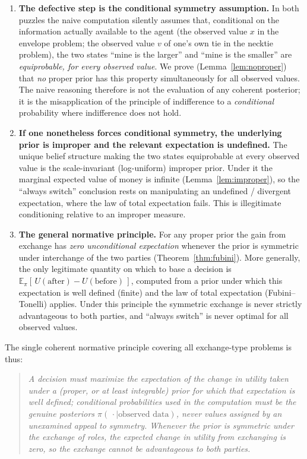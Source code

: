\documentclass{amsart}
\theoremstyle{plain}
\theoremstyle{definition}
\begin{document}
\begin{enumerate}
\item[(R1)] \textbf{The defective step is the conditional symmetry assumption.}
In both puzzles the naive computation silently assumes that, conditional on the
information actually available to the agent (the observed value $x$ in the
envelope problem; the observed value $v$ of one's own tie in the necktie
problem), the two states ``mine is the larger'' and ``mine is the smaller'' are
\emph{equiprobable, for every observed value}. We prove (Lemma~\ref{lem:noproper})
that \emph{no} proper prior has this property simultaneously for all observed
values. The naive reasoning therefore is not the evaluation of any coherent
posterior; it is the misapplication of the principle of indifference to a
\emph{conditional} probability where indifference does not hold.

\item[(R2)] \textbf{If one nonetheless forces conditional symmetry, the
underlying prior is improper and the relevant expectation is undefined.} The
unique belief structure making the two states equiprobable at every observed
value is the scale-invariant (log-uniform) improper prior. Under it the marginal
expected value of money is infinite (Lemma~\ref{lem:improper}), so the
``always switch'' conclusion rests on manipulating an undefined / divergent
expectation, where the law of total expectation fails. This is illegitimate
conditioning relative to an improper measure.

\item[(R3)] \textbf{The general normative principle.} For any proper prior the
gain from exchange has \emph{zero unconditional expectation} whenever the prior
is symmetric under interchange of the two parties
(Theorem~\ref{thm:fubini}). More generally, the only legitimate quantity on
which to base a decision is $\mathbb E_\pi[\,U(\text{after})-U(\text{before})\,]$,
computed from a prior under which this expectation is well defined (finite) and
the law of total expectation (Fubini--Tonelli) applies. Under this principle
the symmetric exchange is never strictly advantageous to both parties, and
``always switch'' is never optimal for all observed values.
\end{enumerate}

The single coherent normative principle covering all exchange-type problems is
thus:

\begin{quote}
\emph{A decision must maximize the expectation of the change in utility taken
under a (proper, or at least integrable) prior for which that expectation is
well defined; conditional probabilities used in the computation must be the
genuine posteriors $\pi(\,\cdot\mid \text{observed data})$, never values
assigned by an unexamined appeal to symmetry. Whenever the prior is symmetric
under the exchange of roles, the expected change in utility from exchanging is
zero, so the exchange cannot be advantageous to both parties.}
\end{quote}
\end{document}
